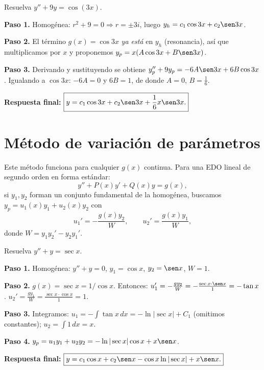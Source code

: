 \begin{example}
Resuelva $y'' + 9y = \cos(3x)$.

\begin{myproof}
\textbf{Paso 1.} Homogénea: $r^2+9=0 \Rightarrow r=\pm 3i$, luego $y_h=c_1\cos 3x+c_2\sen 3x$.

\textbf{Paso 2.} El término $g(x)=\cos 3x$ \emph{ya está} en $y_h$ (resonancia), así que multiplicamos por $x$ y proponemos $y_p=x(A\cos 3x+B\sen 3x)$.

\textbf{Paso 3.} Derivando y sustituyendo se obtiene $y_p''+9y_p=-6A\sen 3x+6B\cos 3x$. Igualando a $\cos 3x$: $-6A=0$ y $6B=1$, de donde $A=0$, $B=\frac{1}{6}$.

\textbf{Respuesta final:} $\boxed{y=c_1\cos 3x+c_2\sen 3x+\frac{1}{6}x\sen 3x.}$
\end{myproof}
\end{example}

\section{Método de variación de parámetros}

Este método funciona para cualquier $g(x)$ continua. Para una EDO lineal de segundo orden en forma estándar:
\[
y'' + P(x)y' + Q(x)y = g(x),
\]
si $y_1, y_2$ forman un conjunto fundamental de la homogénea, buscamos $y_p = u_1(x) y_1 + u_2(x) y_2$ con
\[
u_1' = -\frac{g(x) y_2}{W}, \qquad u_2' = \frac{g(x) y_1}{W},
\]
donde $W = y_1 y_2' - y_2 y_1'$.

\begin{example}[$g(x) = \sec x$]
Resuelva $y'' + y = \sec x$.

\begin{myproof}
\textbf{Paso 1.} Homogénea: $y''+y=0$, $y_1=\cos x$, $y_2=\sen x$, $W = 1$.

\textbf{Paso 2.} $g(x)=\sec x = 1/\cos x$. Entonces:
$u_1' = -\frac{g y_2}{W} = -\frac{\sec x \cdot \sen x}{1} = -\tan x$.
$u_2' = \frac{g y_1}{W} = \frac{\sec x \cdot \cos x}{1} = 1$.

\textbf{Paso 3.} Integramos: $u_1 = -\int \tan x \, dx = -\ln|\sec x| + C_1$ (omitimos constantes); $u_2 = \int 1 \, dx = x$.

\textbf{Paso 4.} $y_p = u_1 y_1 + u_2 y_2 = -\ln|\sec x| \cos x + x \sen x$.

\textbf{Respuesta final:} $\boxed{y = c_1 \cos x + c_2 \sen x - \cos x \ln|\sec x| + x \sen x.}$
\end{myproof}
\end{example}


